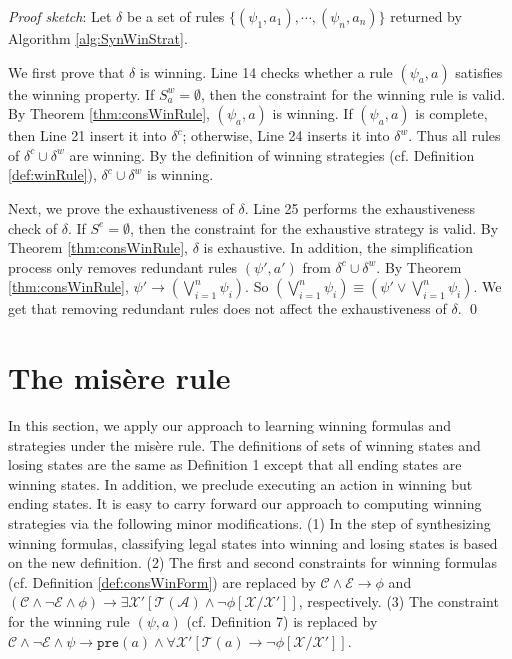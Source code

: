 \documentclass[review]{elsarticle}
\newcommand{\set}[1]{\{ #1 \}}
\newcommand{\statevar}{\mathcal{X}}
\newcommand{\act}{\mathcal{A}}
\newcommand{\trans}{\mathcal{T}}
\newcommand{\constraint}{\mathcal{C}}
\newcommand{\estate}{\mathcal{E}}
\newcommand{\pre}{\mathtt{pre}}
\newenvironment{proofsketch}{\textit{Proof sketch}:}{\qed}
\begin{document}
\begin{proofsketch}
	Let $\delta$ be a set of rules $\set{(\psi_1, a_1), \cdots, (\psi_n, a_n)}$ returned by Algorithm \ref{alg:SynWinStrat}.
	
	We first prove that $\delta$ is winning.
	Line 14 checks whether a rule $(\psi_a, a)$ satisfies the winning property.
	If $S^w_a = \emptyset$,	then the constraint for the winning rule is valid.
	By Theorem \ref{thm:consWinRule}, $(\psi_a, a)$ is winning.
	If $(\psi_a, a)$ is complete, then Line 21 insert it into $\delta^c$; otherwise, Line 24 inserts it into $\delta^w$.
	Thus all rules of $\delta^c \cup \delta^w$ are winning.
	By the definition of winning strategies (cf. Definition \ref{def:winRule}), $\delta^c \cup \delta^w$ is winning.
	
	Next, we prove the exhaustiveness of $\delta$.
	Line 25 performs the exhaustiveness check of $\delta$. 
	If $S^e = \emptyset$, then the constraint for the exhaustive strategy is valid.
	By Theorem \ref{thm:consWinRule}, $\delta$ is exhaustive.
	In addition, the simplification process only removes redundant rules $(\psi', a')$ from $\delta^c \cup \delta^w$.
	By Theorem \ref{thm:consWinRule}, $\psi' \rightarrow (\bigvee_{i = 1}^n \psi_i)$.
	So $(\bigvee_{i = 1}^n \psi_i) \equiv (\psi' \lor \bigvee_{i = 1}^n \psi_i)$.
	We get that removing redundant rules does not affect the exhaustiveness of $\delta$.
\end{proofsketch}


\section{The mis\`{e}re rule} \label{sec:misere}
	In this section, we apply our approach to learning winning formulas and strategies under the mis\`{e}re rule. The definitions of sets of winning states and losing states are the same as Definition 1 except that all ending states are winning states.
	In addition, we preclude executing an action in winning but ending states.
	It is easy to carry forward our approach to computing winning strategies via the following minor modifications.
	(1) In the step of synthesizing winning formulas, classifying legal states into winning and losing states is based on the new definition.
	(2) The first and second constraints for winning formulas (cf. Definition \ref{def:consWinForm}) are replaced by $\constraint \land \estate \rightarrow \phi$ and $(\constraint \land \neg \estate \land \phi) \rightarrow \exists \statevar' [\trans(\act) \land \neg \phi[\statevar/\statevar']]$, respectively. 
	(3) The constraint for the winning rule $(\psi, a)$ (cf. Definition 7) is replaced by $\constraint \land \neg \estate \land \psi \rightarrow  \pre(a)  \land \forall \statevar' [\trans(a) \rightarrow \neg \phi[\statevar/\statevar']]$.
	
\end{document}
